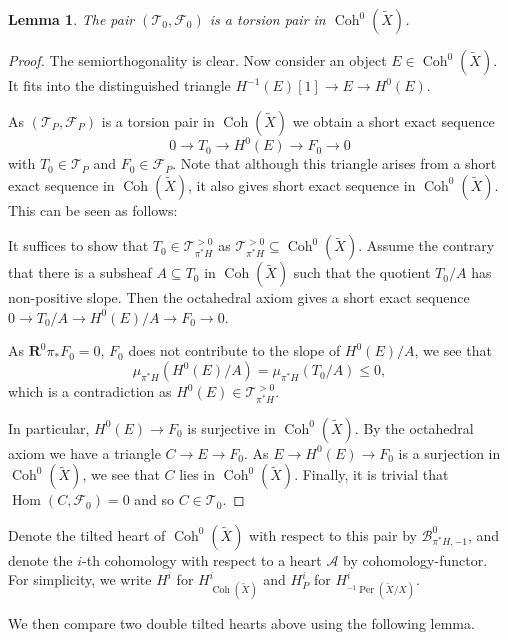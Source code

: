 \documentclass[12pt]{amsart}
\newtheorem{lemma}[theorem]{Lemma}
\theoremstyle{definition}
\DeclareMathOperator{\Hom}{Hom}
\DeclareMathOperator{\Coh}{Coh}
\DeclareMathOperator{\Per}{Per}
\begin{document}
\begin{lemma}
The pair $(\mathcal{T}_0,\mathcal{F}_0)$ is a torsion pair in $\Coh^0(\widetilde{X})$.
\end{lemma}
\begin{proof}
The semiorthogonality is clear. 
Now consider an object $E \in \Coh^0(\widetilde{X})$. 
It fits into the distinguished triangle $H^{-1}(E)[1]\longrightarrow E\longrightarrow H^0(E)$.

As $(\mathcal{T}_P,\mathcal{F}_P)$ is a torsion pair in $\Coh(\widetilde{X})$ we obtain a short exact sequence $$ 0 \longrightarrow T_0 \longrightarrow H^0(E) \longrightarrow F_0  \longrightarrow 0$$ with $T_0 \in \mathcal{T}_P$ and $F_0\in \mathcal{F}_P$. 
Note that although this triangle arises from a short exact sequence in $\Coh(\widetilde{X})$,
it also gives short exact sequence in $\Coh^0(\widetilde{X})$.
This can be seen as follows:

It suffices to show that $T_0 \in \mathcal{T}^{> 0}_{\pi^\ast H}$ as $\mathcal{T}^{> 0}_{\pi^\ast H} \subseteq \Coh^0(\widetilde{X})$.
Assume the contrary that there is a subsheaf $A \subseteq T_0$ in $\Coh(\widetilde{X})$ such that the quotient $T_0/A$ has non-positive slope.
Then the octahedral axiom gives a short exact sequence $ 0 \longrightarrow T_0/A \longrightarrow H^0(E)/A \longrightarrow F_0  \longrightarrow 0$.

As $\mathbf{R}^0\pi_\ast F_0 = 0$, $F_0$ does not contribute to the slope of $H^0(E)/A$, we see that 
\[\mu_{\pi^\ast H}(H^0(E)/A) = \mu_{\pi^\ast H}(T_0/A)\leq0,\]
which is a contradiction as $H^0(E) \in \mathcal{T}^{> 0}_{\pi^\ast H}$.

In particular, $H^0(E) \longrightarrow F_0$ is surjective in $\Coh^0(\widetilde{X})$.
By the octahedral axiom we have a triangle $C \longrightarrow E \longrightarrow F_0$. As $E \longrightarrow H^0(E) \longrightarrow F_0$ is a surjection in $\Coh^0(\widetilde{X})$, we see that $C$ lies in $\Coh^0(\widetilde{X})$.
Finally, it is trivial that $\Hom(C,\mathcal{F}_0) = 0$ and so $C \in \mathcal{T}_0$.
\end{proof}

Denote the tilted heart of $\Coh^0(\widetilde{X})$ with respect to this pair by $ \mathcal{B}^0_{\pi^\ast H,-1}$,
and denote the $i$-th cohomology with respect to a heart $\mathcal{A}$ by \gls{cohomology-functor}.
For simplicity, we write $H^i$ for $H^i_{\Coh(\widetilde{X})}$ and $H^i_P$ for $H^i_{^{-1}\Per(\widetilde{X}/X)}$.

We then compare two double tilted hearts above using the following lemma.
\end{document}

